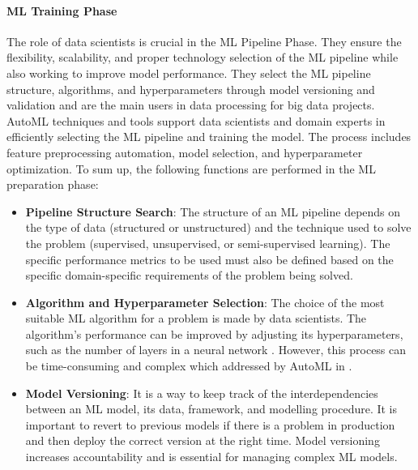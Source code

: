 \documentclass[conference]{IEEEtran}
\begin{document}
\paragraph{ML Training Phase}
The role of data scientists is crucial in the ML Pipeline Phase. They ensure the flexibility, scalability, and proper technology selection of the ML pipeline while also working to improve model performance. They select the ML pipeline structure, algorithms, and hyperparameters through model versioning and validation and are the main users in data processing for big data projects. AutoML techniques \cite{automl} and tools support data scientists and domain experts in efficiently selecting the ML pipeline and training the model. The process includes feature preprocessing automation, model selection, and hyperparameter optimization. To sum up, the following functions are performed in the ML preparation phase:
\begin{itemize}
	\item \textbf{Pipeline Structure Search}: The structure of an ML pipeline depends on the type of data (structured or unstructured) and the technique used to solve the problem (supervised, unsupervised, or semi-supervised learning). The specific performance metrics to be used must also be defined based on the specific domain-specific requirements of the problem being solved.
	\item \textbf{Algorithm and Hyperparameter Selection}: The choice of the most suitable ML algorithm for a problem is made by data scientists. The algorithm's performance can be improved by adjusting its hyperparameters, such as the number of layers in a neural network \cite{kisskalt2020streamlining}. However, this process can be time-consuming and complex which addressed by AutoML in \cite{automl}.
	\item \textbf{Model Versioning}: It is a way to keep track of the interdependencies between an ML model, its data, framework, and modelling procedure. It is important to revert to previous models if there is a problem in production and then deploy the correct version at the right time. Model versioning increases accountability and is essential for managing complex ML models.
\end{itemize}
\end{document}
